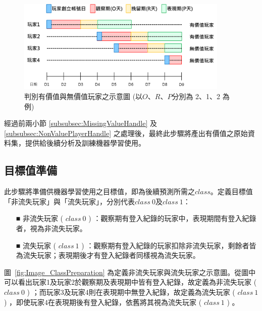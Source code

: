\begin{figure}[!htb]
  \begin{center}
    \includegraphics[width=0.9\textwidth]{figures/Image_DataCleaning.png}
    \caption[判別有價值與無價值玩家之示意圖]{判別有價值與無價值玩家之示意圖 (以$O$、$R$、$P$分別為 2、1、2 為例) }
    \label{fig:Image_DataCleaning}
  \end{center}
\end{figure}

經過前兩小節 \ref{subsubsec:MissingValueHandle} 及 \ref{subsubsec:NonValuePlayerHandle} 之處理後，最終此步驟將產出有價值之原始資料集，提供給後續分析及訓練機器學習使用。

\subsection{目標值準備}
\label{subsec:ClassPreparation}

此步驟將準備供機器學習使用之目標值，即為後續預測所需之$class$。定義目標值「非流失玩家」與「流失玩家」，分別代表$class\ 0$及$class\ 1$：

\begin{itemize}
  \item [■] 非流失玩家 ( $class\ 0$ ) ：觀察期有登入紀錄的玩家中，表現期間有登入紀錄者，視為非流失玩家。
  \item [■] 流失玩家 ( $class\ 1$ ) ：觀察期有登入紀錄的玩家扣除非流失玩家，剩餘者皆為流失玩家；表現期後才有登入紀錄者同樣視為流失玩家。
\end{itemize}

圖~\ref{fig:Image_ClassPreparation} 為定義非流失玩家與流失玩家之示意圖。從圖中可以看出玩家1及玩家2於觀察期及表現期中皆有登入紀錄，故定義為非流失玩家 ( $class\ 0$ ) ；而玩家3及玩家4則在表現期中無登入紀錄，故定義為流失玩家 ( $class\ 1$ ) ，即使玩家4在表現期後有登入紀錄，依舊將其視為流失玩家 ( $class\ 1$ ) 。

